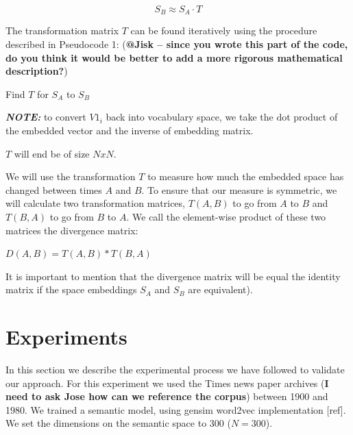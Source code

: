 \documentclass{article} %
\begin{document}
$$S_B \approx S_A \cdot T$$

The transformation matrix $T$ can be found iteratively using the procedure described in Pseudocode 1: (\textbf{@Jisk -- since you wrote this part of the code, do you think it would be better to add a more rigorous mathematical description?})

\begin{algorithm}[H]
 \caption{Find $T$ for $S_A$ to $S_B$}
\end{algorithm}


\textbf{\textit{NOTE:}} to convert $V1_i$ back into vocabulary space, we take the dot product of the embedded vector and the inverse of embedding matrix.

$T$ will end be of size $NxN$.

We will use the transformation $T$ to measure how much the embedded space has changed between times $A$ and $B$. To ensure that our measure is symmetric, we will calculate two transformation matrices, $T(A,B)$ to go from $A$ to $B$ and $T(B,A)$ to go from $B$ to $A$. We call the element-wise product of these two matrices the divergence matrix:

$D(A,B) = T(A,B) * T(B,A)$

It is important to mention that the divergence matrix will be equal the identity matrix if the space embeddings $S_A$ and $S_B$ are equivalent).

\section{Experiments}
\label{sec:experiments}
In this section we describe the experimental process we have followed to validate our approach. For this experiment we used the Times news paper archives (\textbf{I need to ask Jose how can we reference the corpus}) between 1900 and 1980. We trained a semantic model, using gensim word2vec implementation [ref]. We set the dimensions on the semantic space to 300 ($N = 300$).
\end{document}
